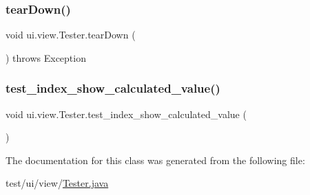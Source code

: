 \mbox{\label{classui_1_1view_1_1Tester_a003a16bd8a57459ad09e0ec16f4cc825}} 
\subsubsection{\texorpdfstring{tear\+Down()}{tearDown()}}
{\footnotesize\ttfamily void ui.\+view.\+Tester.\+tear\+Down (\begin{DoxyParamCaption}{ }\end{DoxyParamCaption}) throws Exception\hspace{0.3cm}{\ttfamily [inline]}}

\mbox{\label{classui_1_1view_1_1Tester_a91deee94b10560269017b4ed8753df29}} 
\subsubsection{\texorpdfstring{test\+\_\+index\+\_\+show\+\_\+calculated\+\_\+value()}{test\_index\_show\_calculated\_value()}}
{\footnotesize\ttfamily void ui.\+view.\+Tester.\+test\+\_\+index\+\_\+show\+\_\+calculated\+\_\+value (\begin{DoxyParamCaption}{ }\end{DoxyParamCaption})\hspace{0.3cm}{\ttfamily [inline]}}



The documentation for this class was generated from the following file\+:\begin{DoxyCompactItemize}
\item 
test/ui/view/\mbox{\hyperlink{Tester_8java}{Tester.\+java}}\end{DoxyCompactItemize}
